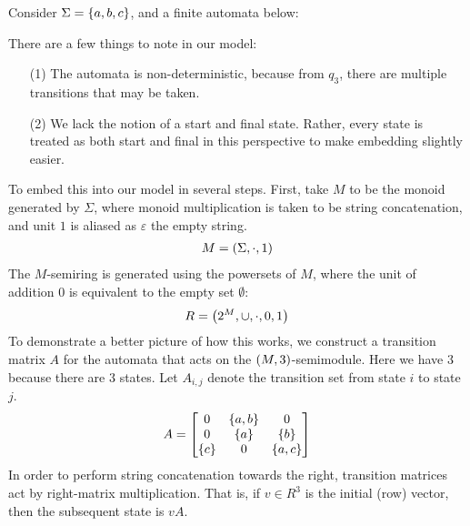 \documentclass[12pt]{article}
\begin{document}
\begin{example}
  Consider \(\Sigma = \left\{a, b, c\right\}\),
  and a finite automata below:

  \begin{center}
  \end{center}
  There are a few things to note in our model:
  \begin{enumerate}
    \item[(1)]
      The automata is non-deterministic, because from \(q_3\),
      there are multiple transitions that may be taken.

    \item[(2)]
      We lack the notion of a start and final state.
      Rather, every state is treated as both start and final in
      this perspective to make embedding slightly easier.
  \end{enumerate}
  To embed this into our model in several steps.
  First, take \(M\) to be the monoid generated by \(\Sigma\),
  where monoid multiplication is taken to be string concatenation,
  and unit \(1\) is aliased as \(\varepsilon\) the empty string.
  \begin{align*}
    M = \left(\Sigma, \cdot, 1\right)
  \end{align*}
  The \(M\)-semiring is generated using the powersets of \(M\),
  where the unit of addition \(0\) is equivalent to the
  empty set \(\emptyset\):
  \begin{align*}
    R = \left(2^{M}, \cup, \cdot, 0, 1\right)
  \end{align*}
  To demonstrate a better picture of how this works, we construct a
  transition matrix \(A\) for the automata
  that acts on the \(\left(M, 3\right)\)-semimodule.
  Here we have \(3\) because there are \(3\) states.
  Let \(A_{i, j}\) denote the transition set from state \(i\) to
  state \(j\).
  \begin{align*}
    A =
      \begin{bmatrix}
        0 & \left\{a, b\right\} & 0 \\
        0 & \left\{a\right\} & \left\{b\right\} \\
        \left\{c\right\} & 0 & \left\{a, c\right\}
      \end{bmatrix}
  \end{align*}
  In order to perform string concatenation towards the right,
  transition matrices act by right-matrix multiplication.
  That is, if \(v \in R^3\) is the initial (row) vector,
  then the subsequent state is \(v A\).


\end{example}
\end{document}
